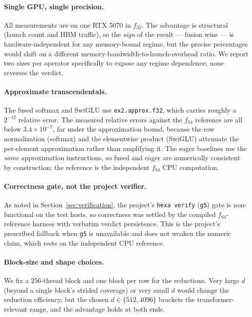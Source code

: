 \documentclass[11pt,a4paper]{article}
\begin{document}
\paragraph{Single GPU, single precision.} All measurements are on one RTX 5070
in $f_{32}$. The advantage is structural (launch count and HBM traffic), so the
\emph{sign} of the result --- fusion wins --- is hardware-independent for any
memory-bound regime, but the precise percentages would shift on a different
memory-bandwidth-to-launch-overhead ratio. We report two sizes per operator
specifically to expose any regime dependence; none reverses the verdict.

\paragraph{Approximate transcendentals.} The fused softmax and SwiGLU use
\texttt{ex2.approx.f32}, which carries roughly a $2^{-12}$ relative error. The
measured relative errors against the $f_{64}$ reference are all below
$3.4\times10^{-7}$, far under the approximation bound, because the row
normalization (softmax) and the elementwise product (SwiGLU) attenuate the
per-element approximation rather than amplifying it. The eager baselines use the
\emph{same} approximation instructions, so fused and eager are numerically
consistent by construction; the reference is the independent $f_{64}$ CPU
computation.

\paragraph{Correctness gate, not the project verifier.} As noted in
Section~\ref{sec:verification}, the project's \texttt{hexa verify} (\texttt{g5})
gate is non-functional on the test hosts, so correctness was settled by the
compiled $f_{64}$-reference harness with verbatim verdict persistence. This is
the project's prescribed fallback when \texttt{g5} is unavailable and does not
weaken the numeric claim, which rests on the independent CPU reference.

\paragraph{Block-size and shape choices.} We fix a $256$-thread block and one
block per row for the reductions. Very large $d$ (beyond a single block's
strided coverage) or very small $d$ would change the reduction efficiency, but
the chosen $d\in\{512,4096\}$ brackets the transformer-relevant range, and the
advantage holds at both ends.
\end{document}

